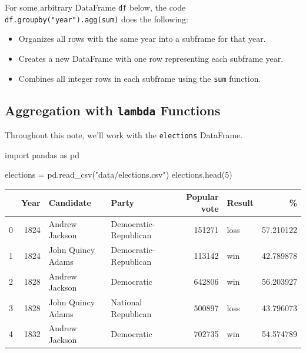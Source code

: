 \documentclass[
  letterpaper,
  DIV=11,
  numbers=noendperiod]{scrreprt}
\newenvironment{Shaded}{\begin{snugshade}}{\end{snugshade}}
\newcommand{\DecValTok}[1]{\textcolor[rgb]{0.68,0.00,0.00}{#1}}
\newcommand{\ImportTok}[1]{\textcolor[rgb]{0.00,0.46,0.62}{#1}}
\newcommand{\NormalTok}[1]{\textcolor[rgb]{0.00,0.23,0.31}{#1}}
\newcommand{\OperatorTok}[1]{\textcolor[rgb]{0.37,0.37,0.37}{#1}}
\newcommand{\StringTok}[1]{\textcolor[rgb]{0.13,0.47,0.30}{#1}}
\providecommand{\tightlist}{%
  \setlength{\itemsep}{0pt}\setlength{\parskip}{0pt}}\usepackage{longtable,booktabs,array}
\begin{document}
For some arbitrary DataFrame \texttt{df} below, the code
\texttt{df.groupby("year").agg(sum)} does the following:

\begin{itemize}
\tightlist
\item
  Organizes all rows with the same year into a subframe for that year.
\item
  Creates a new DataFrame with one row representing each subframe year.
\item
  Combines all integer rows in each subframe using the \texttt{sum}
  function.
\end{itemize}

\hypertarget{aggregation-with-lambda-functions}{%
\subsection{\texorpdfstring{Aggregation with \texttt{lambda}
Functions}{Aggregation with lambda Functions}}\label{aggregation-with-lambda-functions}}

Throughout this note, we'll work with the \texttt{elections} DataFrame.

\begin{Shaded}
\begin{Highlighting}[]
\ImportTok{import}\NormalTok{ pandas }\ImportTok{as}\NormalTok{ pd}

\NormalTok{elections }\OperatorTok{=}\NormalTok{ pd.read\_csv(}\StringTok{"data/elections.csv"}\NormalTok{)}
\NormalTok{elections.head(}\DecValTok{5}\NormalTok{)}
\end{Highlighting}
\end{Shaded}

\begin{tabular}{lrllrlr}
\toprule
{} &  Year &          Candidate &                  Party &  Popular vote & Result &          \% \\
\midrule
0 &  1824 &     Andrew Jackson &  Democratic-Republican &        151271 &   loss &  57.210122 \\
1 &  1824 &  John Quincy Adams &  Democratic-Republican &        113142 &    win &  42.789878 \\
2 &  1828 &     Andrew Jackson &             Democratic &        642806 &    win &  56.203927 \\
3 &  1828 &  John Quincy Adams &    National Republican &        500897 &   loss &  43.796073 \\
4 &  1832 &     Andrew Jackson &             Democratic &        702735 &    win &  54.574789 \\
\bottomrule
\end{tabular}
\end{document}
